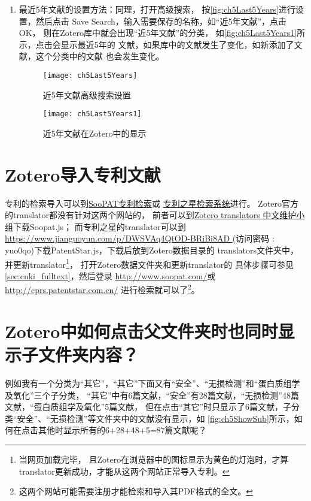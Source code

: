 \documentclass[cn,11pt,chinese]{elegantbook}
\begin{document}
\begin{enumerate}
					\item 最近5年文献的设置方法：同理，打开高级搜索，
					按\autoref{fig:ch5Last5Years}进行设置，然后点击
					 Save Search，输入需要保存的名称，如“近5年文献”，点击OK，
					 则在Zotero库中就会出现“近5年文献”的分类，
					 如\autoref{fig:ch5Last5Years1}所示，点击会显示最近5年的
					 文献，如果库中的文献发生了变化，如新添加了文献，这个分类中的文献
					 也会发生变化。
							\begin{figure}[ht]
								\centering
								\texttt{[image: ch5Last5Years]}
								\caption{近5年文献高级搜索设置}
								\label{fig:ch5Last5Years}
							\end{figure}
						\begin{figure}[ht]
							\centering
							\texttt{[image: ch5Last5Years1]}
							\caption{近5年文献在Zotero中的显示}
							\label{fig:ch5Last5Years1}
						\end{figure}		
				\end{enumerate}


		
		\section{Zotero导入专利文献}\label{sec:Patent}
			专利的检索导入可以到\href{http://www.soopat.com/}{SooPAT专利检索}或
			\href{http://cprs.patentstar.com.cn/}{专利之星检索系统}进行。
			Zotero官方的translator都没有针对这两个网站的，
			前者可以到\href{https://github.com/l0o0/translators_CN}
			{Zotero translators 中文维护小组}下载Soopat.js；
			而专利之星的translator可以到\url{https://www.jianguoyun.com/p/DWSVAq4QtOD-BRiBi8AD
			} (访问密码 : yuo0qo)下载PatentStar.js，下载后放到Zotero数据目录的
			translators文件夹中，并更新translator\footnote{当网页加载完毕，
			且Zotero在浏览器中的图标显示为黄色的灯泡时，才算translator更新成功，才能从这两个网站正常导入专利。}，
			打开Zotero数据文件夹和更新translator的
			具体步骤可参见\cref{sec:cnki_fulltext}，然后登录
			\url{http://www.soopat.com/}或\url{http://cprs.patentstar.com.cn/}
			进行检索就可以了\footnote{这两个网站可能需要注册才能检索和导入其PDF格式的全文。}。
		

			\section{Zotero中如何点击父文件夹时也同时显示子文件夹内容？}\label{sec:ShowSub}	
				例如我有一个分类为“其它”，“其它”下面又有“安全”、“无损检测”和“蛋白质组学及氧化”三个子分类，
				“其它”中有6篇文献，“安全”有28篇文献，“无损检测”48篇文献，“蛋白质组学及氧化”5篇文献，
				但在点击“其它”时只显示了6篇文献，子分类“安全”、“无损检测”等文件夹中的文献没有显示，如
				\autoref{fig:ch5ShowSub}所示，如何在点击其他时显示所有的6+28+48+5=87篇文献呢？
\end{document}
